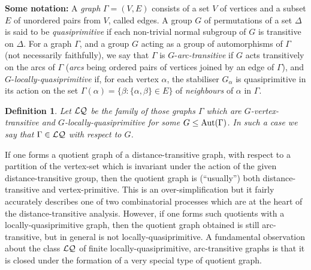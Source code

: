 \documentclass[12pt, a4paper]{article}
\newtheorem{definition}[theorem]{Definition}
\def\FB{{\cal LQ}}
\def\Ga{\Gamma}
\def\a{\alpha}
\def\b{\beta}
\def\Aut{{\rm Aut}}
\begin{document}
\medskip
\noindent\textbf{Some notation:}\quad 
A {\em graph} $\Gamma = (V,E)$ consists of a set $V$ of vertices and a
subset $E$ of unordered pairs from $V$, called edges.
A group $G$ of permutations of a set $\Delta$ is said to be {\em quasiprimitive}
if each non-trivial normal subgroup of $G$ is transitive on $\Delta$.
For a graph $\Gamma$, and a group $G$ acting as a group of automorphisms
of $\Gamma$ (not necessarily faithfully), we say that $\Gamma$ is 
$G$-{\em arc-transitive} if $G$
acts transitively on the arcs of $\Gamma$ ({\em arcs} being ordered
pairs of vertices joined by an edge of $\Gamma$), and
$G$-{\em locally-quasiprimitive} if, for each vertex $\alpha$, the
stabiliser
$G_{\alpha}$ is quasiprimitive in its action on the set
$\Gamma(\alpha)=\{\beta: \{\a,\b\}\in E\}$ of {\em neighbours} of
$\alpha$ in $\Gamma$.

 
\begin{definition}
\label{defn:F}{\rm
Let $\FB$ be the family of those graphs $\Ga$ which are
$G$-vertex-transitive and $G$-locally-quasiprimitive for 
some $G \leq \Aut(\Ga)$. In such a
case we say that $\Ga \in \FB$ \emph{with respect to} $G$. }
\end{definition}

If one forms a quotient graph of a distance-transitive graph, with respect to a
partition of the vertex-set which is invariant under the action of the given
distance-transitive group, then the quotient graph is (``usually'') both
distance-transitive and vertex-primitive.  This is an over-simplification but it
fairly accurately describes one of two combinatorial processes which are at the
heart of the distance-transitive analysis.  However, if one forms such quotients
with a locally-quasiprimitive graph, then the quotient graph obtained is still
arc-transitive, but in general is not locally-quasiprimitive.  A fundamental
observation about the class $\FB$ of finite locally-quasiprimitive,
arc-transitive graphs is that it is closed under the formation of a very special
type of quotient graph.
\end{document}
